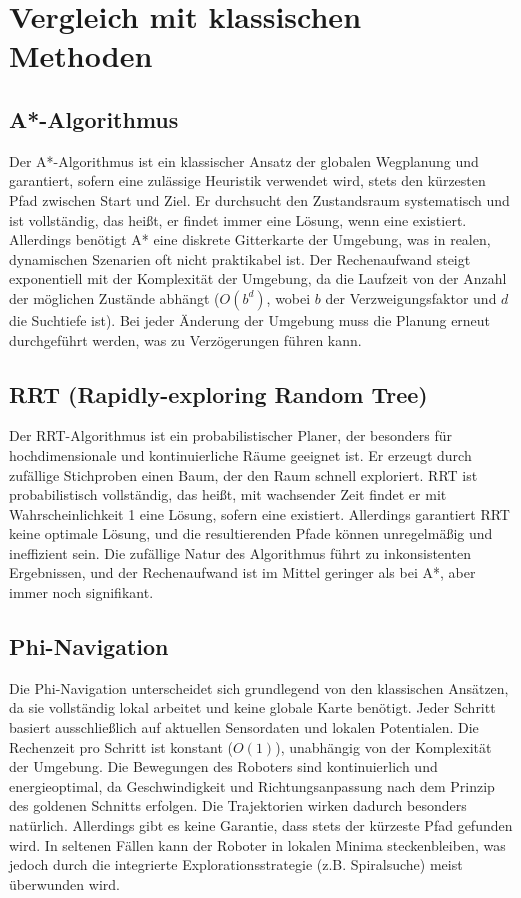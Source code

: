 ﻿\documentclass[a4paper,12pt]{article}
\theoremstyle{definition}
\begin{document}
\section{Vergleich mit klassischen Methoden}

\subsection{A*-Algorithmus}

Der A*-Algorithmus ist ein klassischer Ansatz der globalen Wegplanung und garantiert, sofern eine zulässige Heuristik verwendet wird, stets den kürzesten Pfad zwischen Start und Ziel. Er durchsucht den Zustandsraum systematisch und ist vollständig, das heißt, er findet immer eine Lösung, wenn eine existiert. Allerdings benötigt A* eine diskrete Gitterkarte der Umgebung, was in realen, dynamischen Szenarien oft nicht praktikabel ist. Der Rechenaufwand steigt exponentiell mit der Komplexität der Umgebung, da die Laufzeit von der Anzahl der möglichen Zustände abhängt ($O(b^d)$, wobei $b$ der Verzweigungsfaktor und $d$ die Suchtiefe ist). Bei jeder Änderung der Umgebung muss die Planung erneut durchgeführt werden, was zu Verzögerungen führen kann.

\subsection{RRT (Rapidly-exploring Random Tree)}

Der RRT-Algorithmus ist ein probabilistischer Planer, der besonders für hochdimensionale und kontinuierliche Räume geeignet ist. Er erzeugt durch zufällige Stichproben einen Baum, der den Raum schnell exploriert. RRT ist probabilistisch vollständig, das heißt, mit wachsender Zeit findet er mit Wahrscheinlichkeit 1 eine Lösung, sofern eine existiert. Allerdings garantiert RRT keine optimale Lösung, und die resultierenden Pfade können unregelmäßig und ineffizient sein. Die zufällige Natur des Algorithmus führt zu inkonsistenten Ergebnissen, und der Rechenaufwand ist im Mittel geringer als bei A*, aber immer noch signifikant.

\subsection{Phi-Navigation}

Die Phi-Navigation unterscheidet sich grundlegend von den klassischen Ansätzen, da sie vollständig lokal arbeitet und keine globale Karte benötigt. Jeder Schritt basiert ausschließlich auf aktuellen Sensordaten und lokalen Potentialen. Die Rechenzeit pro Schritt ist konstant ($O(1)$), unabhängig von der Komplexität der Umgebung. Die Bewegungen des Roboters sind kontinuierlich und energieoptimal, da Geschwindigkeit und Richtungsanpassung nach dem Prinzip des goldenen Schnitts erfolgen. Die Trajektorien wirken dadurch besonders natürlich. Allerdings gibt es keine Garantie, dass stets der kürzeste Pfad gefunden wird. In seltenen Fällen kann der Roboter in lokalen Minima steckenbleiben, was jedoch durch die integrierte Explorationsstrategie (z.B. Spiralsuche) meist überwunden wird.
\end{document}

